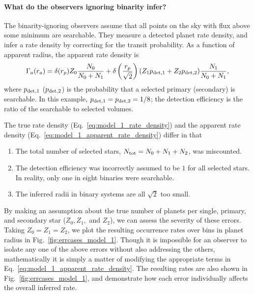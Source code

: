 \paragraph{What do the observers ignoring binarity infer?} 
The binarity-ignoring observers assume that all points on the sky with flux 
above some minimum are searchable.
They measure a detected planet rate density, and infer a rate 
density by correcting for the transit probability.
As a function of apparent radius, the apparent rate density is
\begin{equation}
\Gamma_a(r_a) = 
\delta(r_p) Z_0 \frac{N_0}{N_0+N_1}  +
\delta\left(\frac{r_p}{\sqrt{2}}\right) 
(Z_1 p_{{\rm det},1} + Z_2 p_{{\rm det},2}) \frac{N_1}{N_0+N_1},
\label{eq:model_1_apparent_rate_density}
\end{equation}
where $p_{{\rm det},1}$ ($p_{{\rm det},2}$) is the probability that a selected 
primary (secondary) is searchable.
In this example, $p_{{\rm det},1}=p_{{\rm det},2}=1/8$; the detection 
efficiency is the ratio of the searchable to selected volumes.

The true rate density (Eq.~\ref{eq:model_1_rate_density}) and the
apparent rate density (Eq.~\ref{eq:model_1_apparent_rate_density})
differ in that
\begin{enumerate}
\item The total number of selected stars, $N_{\rm tot} = N_0+N_1+N_2$, was 
miscounted.
%
\item The detection efficiency was incorrectly assumed to be $1$ for all 
selected stars. In reality, only one in eight binaries were searchable.
%
\item The inferred radii in binary systems are all $\sqrt{2}$ too small.
\end{enumerate}
By making an assumption about the true number of planets per single, primary, 
and secondary star ($Z_0,Z_1,$ and $Z_2$), we can assess the severity of 
these errors.
Taking $Z_0=Z_1=Z_2$, we plot the resulting occurrence rates over bins 
in planet radius in Fig.~\ref{fig:errcases_model_1}.
Though it is impossible for an observer to isolate any one of the above 
errors without also addressing the others, mathematically it is simply a 
matter of modifying the appropriate terms in 
Eq.~\ref{eq:model_1_apparent_rate_density}.
The resulting rates are also shown in 
Fig.~\ref{fig:errcases_model_1}, and demonstrate how each 
error individually affects the overall inferred rate.

